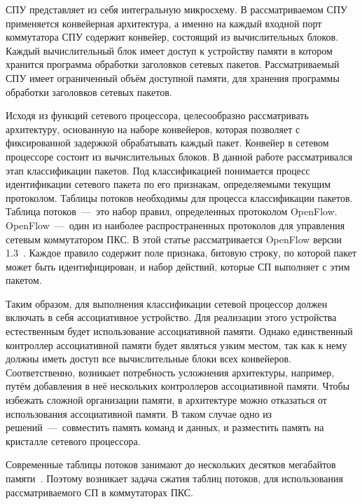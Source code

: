 \documentclass[oneside,final,12pt]{extarticle}
\begin{document}
        СПУ представляет из себя интегральную микросхему. В рассматриваемом СПУ применяется 
        конвейерная архитектура, а именно на каждый входной порт коммутатора СПУ содержит 
        конвейер, состоящий из вычислительных блоков. Каждый вычислительный блок имеет доступ к 
        устройству памяти в котором хранится программа обработки заголовков сетевых пакетов. 
        Рассматриваемый СПУ имеет ограниченный объём доступной
        памяти, для хранения программы обработки заголовков сетевых пакетов.
        
        Исходя из функций сетевого процессора, целесообразно рассматривать архитектуру, 
        основанную на наборе конвейеров, которая позволяет с фиксированной задержкой 
        обрабатывать каждый пакет. Конвейер в сетевом процессоре состоит из вычислительных блоков.
        В данной работе рассматривался этап классификации пакетов. 
        Под классификацией понимается процесс идентификации сетевого пакета по его признакам, 
        определяемыми текущим протоколом.
        Таблицы потоков необходимы для процесса классификации пакетов.
        Таблица потоков~---~это набор правил, определенных протоколом OpenFlow. 
        OpenFlow~---~один из наиболее распространенных протоколов для управления сетевым 
        коммутатором ПКС. В этой статье рассматривается OpenFlow версии 1.3~\cite{openflow}. 
        Каждое правило содержит поле признака, битовую строку, по которой пакет может быть 
        идентифицирован, и набор действий, которые СП выполняет с этим пакетом.
        
        Таким образом, для выполнения классификации сетевой процессор должен включать в себя 
        ассоциативное устройство. Для реализации этого устройства естественным 
        будет использование ассоциативной памяти. Однако единственный контроллер ассоциативной 
        памяти будет являться узким местом, так как к нему должны иметь доступ 
        все вычислительные блоки всех конвейеров. Соответственно, возникает потребность 
        усложнения архитектуры, например, путём добавления в неё нескольких контроллеров 
        ассоциативной памяти. Чтобы избежать сложной организации памяти, в архитектуре 
        можно отказаться от использования ассоциативной памяти. В таком случае одно из 
        решений~---~совместить память команд и данных, и разместить память на кристалле 
        сетевого процессора.
 
        Современные таблицы потоков занимают до нескольких десятков 
        мегабайтов памяти~\cite{rottenstreich2016optimal}. 
        Поэтому возникает задача сжатия таблиц потоков, 
        для использования рассматриваемого СП в коммутаторах ПКС.
\end{document}
